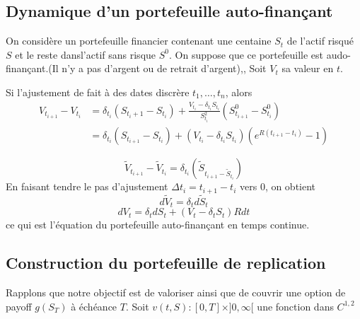 \documentclass{article}
\begin{document}
\subsection{Dynamique d'un portefeuille auto-finan\c{c}ant}
On consid\`ere un portefeuille financier contenant une centaine $S_t$ de l'actif risqu\'e $S$ et le reste dansl'actif sans risque $S^0$.
On suppose que ce portefeuille est audo-finan\c{c}ant.(Il n'y a pas d'argent ou de retrait d'argent),, Soit $V_t$
 sa valeur en $t$.
 
Si l'ajustement de fait \`a des dates discr\`ere $t_1,\ldots,t_n$,  alors
\begin{equation}
\begin{split}
V_{t_{i+1}}-V_{t_i}&=\delta_{t_i}(S_{t_i+1}-S_{t_i})+\frac{V_{t_i}-\delta_{t_i}S_{t_i}}{S^2_{t_i}}(S^0_{t_{i+1}}-S^0_{t_{i}})\\
&=\delta_{t_i}(S_{t_{i+1}}-S_{t_i})+(V_{t_i}-\delta_{t_i}S_{t_i})(e^{R(t_{i+1}-t_i)}-1)
\end{split}
\end{equation}

\begin{equation}
\tilde{V}_{t_{i+1}}-\tilde{V}_{t_i}=\delta_{t_i}(\tilde{S}_{t_{i+1}-\tilde{S}_{t_i}})
\end{equation}
En faisant tendre le pas d'ajustement $\Delta t_i=t_{i+1}-t_i$ vers $0$, on obtient
\begin{equation}
d\tilde{V}_t=\delta_td\tilde{S}_t
\end{equation}
\begin{equation}
dV_t=\delta_tdS_t+(V_t-\delta_t S_t)Rdt
\end{equation}
ce qui est l'\'equation du portefeuille auto-finan\c{c}ant en temps continue. 

\subsection{Construction du portefeuille de replication}

Rapplons que notre objectif est de valoriser ainsi que de couvrir une option de payoff $g(S_T)$ \`a \'ech\'eance $T$.
Soit $v(t,S):[0,T]\times]0,\infty[ $ une fonction dans $C^{1,2}$ 
 
\end{document}
